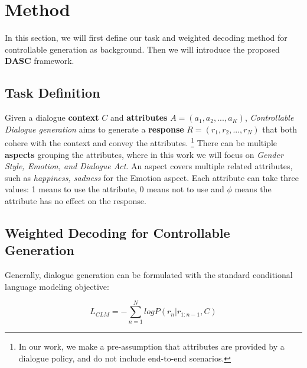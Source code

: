 \section{Method}
\label{sec:method}
In this section, we will first define our task and weighted decoding method for controllable generation as background. Then we will introduce the proposed \textbf{DASC} framework. 
\subsection{Task Definition}

Given a dialogue \textbf{context} $C$ and \textbf{attributes} $A = (a_1, a_2, ..., a_K)$, \textit{Controllable Dialogue generation} aims to generate a \textbf{response} $R = (r_1, r_2, ..., r_N)$ that both cohere with the context and convey the attributes. 
\footnote{In our work, we make a pre-assumption that attributes 
are provided by a dialogue policy, and do not include end-to-end scenarios.}
There can be multiple \textbf{aspects} grouping the attributes, where in this work we will focus on \textit{Gender Style, Emotion, and Dialogue Act}. An aspect covers multiple related attributes, such as \textit{happiness, sadness} for the Emotion aspect. Each attribute can take three values: 1 means to use the attribute, 0 means not to use and $\phi$ means the attribute has no effect on the response.


\subsection{Weighted Decoding for Controllable Generation}
\label{sec:weighted_decoding}

Generally, dialogue generation can be formulated with the standard conditional language modeling objective:

\begin{equation}
    L_{CLM} = -\sum_{n=1}^N log P(r_n|r_{1:n-1}, C)
\end{equation}

